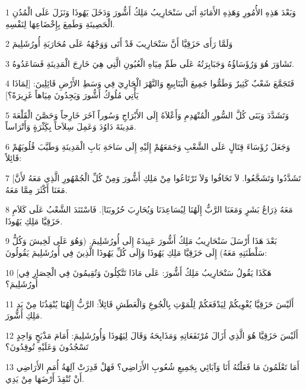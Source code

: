 \par 1 وَبَعْدَ هَذِهِ الأُمُورِ وَهَذِهِ الأَمَانَةِ أَتَى سَنْحَارِيبُ مَلِكُ أَشُّورَ وَدَخَلَ يَهُوذَا وَنَزَلَ عَلَى الْمُدُنِ الْحَصِينَةِ وَطَمِعَ بِإِخْضَاعِهَا لِنَفْسِهِ.
\par 2 وَلَمَّا رَأَى حَزَقِيَّا أَنَّ سَنْحَارِيبَ قَدْ أَتَى وَوَجْهُهُ عَلَى مُحَارَبَةِ أُورُشَلِيمَ
\par 3 تَشَاوَرَ هُوَ وَرُؤَسَاؤُهُ وَجَبَابِرَتُهُ عَلَى طَمِّ مِيَاهِ الْعُيُونِ الَّتِي هِيَ خَارِجَ الْمَدِينَةِ فَسَاعَدُوهُ.
\par 4 فَتَجَمَّعَ شَعْبٌ كَثِيرٌ وَطَمُّوا جَمِيعَ الْيَنَابِيعِ وَالنَّهْرَ الْجَارِيَ فِي وَسَطِ الأَرْضِ قَائِلِينَ: [لِمَاذَا يَأْتِي مُلُوكُ أَشُّورَ وَيَجِدُونَ مِيَاهاً غَزِيرَةً؟]
\par 5 وَتَشَدَّدَ وَبَنَى كُلَّ السُّورِ الْمُنْهَدِمِ وَأَعْلاَهُ إِلَى الأَبْرَاجِ وَسُوراً آخَرَ خَارِجاً وَحَصَّنَ الْقَلْعَةَ مَدِينَةَ دَاوُدَ وَعَمِلَ سِلاَحاً بِكَِثْرَةٍ وَأَتْرَاساً.
\par 6 وَجَعَلَ رُؤَسَاءَ قِتَالٍ عَلَى الشَّعْبِ وَجَمَعَهُمْ إِلَيْهِ إِلَى سَاحَةِ بَابِ الْمَدِينَةِ وَطَيَّبَ قُلُوبَهُمْ قَائِلاً:
\par 7 [تَشَدَّدُوا وَتَشَجَّعُوا. لاَ تَخَافُوا وَلاَ تَرْتَاعُوا مِنْ مَلِكِ أَشُّورَ وَمِنْ كُلِّ الْجُمْهُورِ الَّذِي مَعَهُ لأَنَّ مَعَنَا أَكْثَرَ مِمَّا مَعَهُ.
\par 8 مَعَهُ ذِرَاعُ بَشَرٍ وَمَعَنَا الرَّبُّ إِلَهُنَا لِيُسَاعِدَنَا وَيُحَارِبَ حُرُوبَنَا]. فَاسْتَنَدَ الشَّعْبُ عَلَى كَلاَمِ حَزَقِيَّا مَلِكِ يَهُوذَا.
\par 9 بَعْدَ هَذَا أَرْسَلَ سَنْحَارِيبُ مَلِكُ أَشُّورَ عَبِيدَهُ إِلَى أُورُشَلِيمَ. (وَهُوَ عَلَى لَخِيشَ وَكُلُّ سَلْطَنَتِهِ مَعَهُ) إِلَى حَزَقِيَّا مَلِكِ يَهُوذَا وَإِلَى كُلِّ يَهُوذَا الَّذِينَ فِي أُورُشَلِيمَ يَقُولُونَ:
\par 10 [هَكَذَا يَقُولُ سَنْحَارِيبُ مَلِكُ أَشُّورَ: عَلَى مَاذَا تَتَّكِلُونَ وَتُقِيمُونَ فِي الْحِصَارِ فِي أُورُشَلِيمَ؟
\par 11 أَلَيْسَ حَزَقِيَّا يُغْوِيكُمْ لِيَدْفَعَكُمْ لِلْمَوْتِ بِالْجُوعِ وَالْعَطَشِ قَائِلاً: الرَّبُّ إِلَهُنَا يُنْقِذُنَا مِنْ يَدِ مَلِكِ أَشُّورَ.
\par 12 أَلَيْسَ حَزَقِيَّا هُوَ الَّذِي أَزَالَ مُرْتَفَعَاتِهِ وَمَذَابِحَهُ وَقَالَ لِيَهُوذَا وَأُورُشَلِيمَ: أَمَامَ مَذْبَحٍ وَاحِدٍ تَسْجُدُونَ وَعَلَيْهِ تُوقِدُونَ؟
\par 13 أَمَا تَعْلَمُونَ مَا فَعَلْتُهُ أَنَا وَآبَائِي بِجَمِيعِ شُعُوبِ الأَرَاضِي؟ فَهَلْ قَدِرَتْ آلِهَةُ أُمَمِ الأَرَاضِي أَنْ تُنْقِذَ أَرْضَهَا مِنْ يَدِي.
